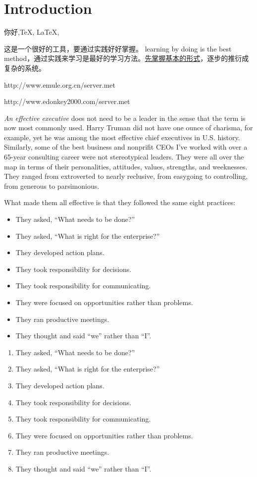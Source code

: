 \newpage
\section{Introduction}
你好,\TeX, \LaTeX, \LaTeXe

这是一个很好的工具，要通过实践好好掌握。 learning by doing is the best
method，通过实践来学习是最好的学习方法。\underline{先掌握基本的形式}，逐步的推衍成复杂的系统。

http://www.emule.org.cn/server.met

http://www.edonkey2000.com/server.met

\emph{An effective executive} does not need to be a leader in the sense that
the term is now most commonly used. Harry Truman did not have one ounce of
charisma, for example, yet he was among the most effective chief executives in
U.S. history. Similarly, some of the best business and nonprifit CEOs I've
worked with over a 65-year consulting career were not stereotypical leaders.
They were all over the map in terms of their personalities, attitudes, values,
strengths, and weeknesses.  They ranged from extroverted to nearly reclusive,
from easygoing to controlling, from generous to parsimonious.

What made them all effective is that they followed the same eight practices:

\begin{itemize}
  \item They asked, ``What needs to be done?''
  \item They asked, ``What is right for the enterprise?''
  \item They developed action plans.
  \item They took responsibility for decisions.
  \item They took responsibility for communicating.
  \item They were focused on opportunities rather than problems.
  \item They ran productive meetings.
  \item They thought and said ``we'' rather than ``I''.
\end{itemize}

\begin{enumerate}
  \item They asked, ``What needs to be done?''
  \item They asked, ``What is right for the enterprise?''
  \item They developed action plans.
  \item They took responsibility for decisions.
  \item They took responsibility for communicating.
  \item They were focused on opportunities rather than problems.
  \item They ran productive meetings.
  \item They thought and said ``we'' rather than ``I''.
\end{enumerate}

